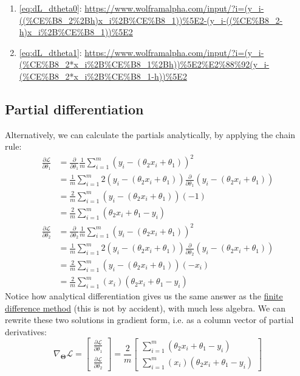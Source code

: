 \documentclass[12pt,initial,twoside,maitrise]{dms}
\numberwithin{equation}{section}
\numberwithin{table}{chapter}
\numberwithin{figure}{chapter}
\begin{document}
%
\begin{enumerate}
    \item[] \autoref{eq:dL_dtheta0}: \url{https://www.wolframalpha.com/input/?i=(y_i-((%CE%B8_2%2Bh)x_i%2B%CE%B8_1))%5E2-(y_i-((%CE%B8_2-h)x_i%2B%CE%B8_1))%5E2}
    \item[] \autoref{eq:dL_dtheta1}: \url{https://www.wolframalpha.com/input/?i=(y_i-(%CE%B8_2*x_i%2B%CE%B8_1%2Bh))%5E2%E2%88%92(y_i-(%CE%B8_2*x_i%2B%CE%B8_1-h))%5E2}
\end{enumerate}

\subsection{Partial differentiation}

\noindent Alternatively, we can calculate the partials analytically, by applying the chain rule:
%
\begin{align}
\frac{\partial\mathcal{L}}{\partial \theta_1} & = \frac{\partial}{\partial \theta_1}\frac{1}{m}\sum_{i=1}^m(y_i - (\theta_2 x_i + \theta_1))^2 \\ & = \frac{1}{m}\sum_{i=1}^m 2 (y_i - (\theta_2 x_i + \theta_1))\frac{\partial}{\partial \theta_1}(y_i - (\theta_2 x_i + \theta_1)) \\ & = \frac{2}{m}\sum_{i=1}^m(y_i - (\theta_2 x_i + \theta_1))(-1) \\ & = \boxed{\frac{2}{m}\sum_{i=1}^m(\theta_2 x_i + \theta_1 - y_i)}
\end{align}
%
\begin{align}
\frac{\partial\mathcal{L}}{\partial \theta_2} & = \frac{\partial}{\partial \theta_2}\frac{1}{m}\sum_{i=1}^m(y_i - (\theta_2 x_i + \theta_1))^2 \\ & = \frac{1}{m}\sum_{i=1}^m 2(y_i - (\theta_2 x_i + \theta_1)) \frac{\partial}{\partial \theta_2}(y_i - (\theta_2 x_i + \theta_1)) \\ & = \frac{2}{m}\sum_{i=1}^m(y_i - (\theta_2 x_i + \theta_1))(-x_i) \\ & = \boxed{\frac{2}{m}\sum_{i=1}^m(x_i)(\theta_2 x_i + \theta_1 - y_i)}
\end{align}
%
Notice how analytical differentiation gives us the same answer as the \hyperref[sec:fdm]{finite difference method} (this is not by accident), with much less algebra. We can rewrite these two solutions in gradient form, i.e. as a column vector of partial derivatives:
%
\begin{equation}
\nabla_{\bm\Theta}\mathcal{L} =
\begin{bmatrix}
\frac{\partial\mathcal{L}}{\partial \theta_1} \\
\frac{\partial\mathcal{L}}{\partial \theta_2}
\end{bmatrix} = \frac{2}{m}
\begin{bmatrix}
\sum_{i=1}^m(\theta_2 x_i + \theta_1 - y_i) \\ \sum_{i=1}^m(x_i)(\theta_2 x_i + \theta_1 - y_i)
\end{bmatrix}
\end{equation}
\end{document}
